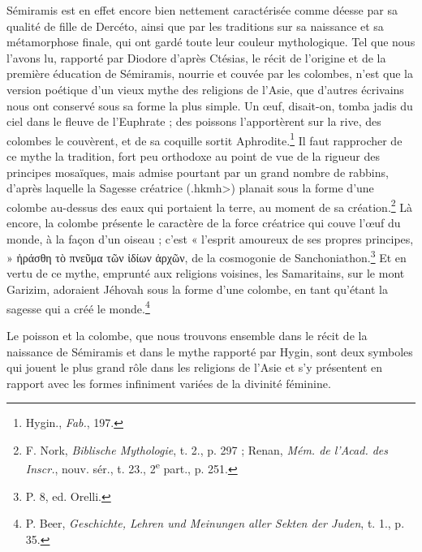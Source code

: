 \documentclass[a4paper, 11pt, oneside, landscape]{article}
\begin{document}
Sémiramis est en effet encore bien nettement caractérisée comme déesse par sa qualité de fille de Dercéto, ainsi que par les traditions sur sa naissance et sa métamorphose finale, qui ont gardé toute leur couleur mythologique. Tel que nous l'avons lu, rapporté par Diodore d'après Ctésias, le récit de l'origine et de la première éducation de Sémiramis, nourrie et couvée par les colombes, n'est que la version poétique d'un vieux mythe des religions de l'Asie, que d'autres écrivains nous ont conservé sous sa forme la plus simple. Un œuf, disait-on, tomba jadis du ciel dans le fleuve de l'Euphrate ; des poissons l'apportèrent sur la rive, des colombes le couvèrent, et de sa coquille sortit Aphrodite.\footnote{Hygin., \emph{Fab.}, 197.} Il faut rapprocher de ce mythe la tradition, fort peu orthodoxe au point de vue de la rigueur des principes mosaïques, mais admise pourtant par un grand nombre de rabbins, d'après laquelle la Sagesse créatrice (\<.hkmh>) planait sous la forme d'une colombe au-dessus des eaux qui portaient la terre, au moment de sa création.\footnote{F. Nork, \emph{Biblische Mythologie}, t. 2., p. 297 ; Renan, \emph{Mém. de l'Acad. des Inscr.}, nouv. sér., t. 23., 2\textsuperscript{e} part., p. 251.} Là encore, la colombe présente le caractère de la force créatrice qui couve l'œuf du monde, à la façon d'un oiseau ; c'est « l'esprit amoureux de ses propres principes, » ἡράσθη τὸ πνεῦμα τῶν ἰδίων ἀρχῶν, de la cosmogonie de Sanchoniathon.\footnote{P. 8, ed. Orelli.} Et en vertu de ce mythe, emprunté aux religions voisines, les Samaritains, sur le mont Garizim, adoraient Jéhovah sous la forme d'une colombe, en tant qu'étant la sagesse qui a créé le monde.\footnote{P. Beer, \emph{Geschichte, Lehren und Meinungen aller Sekten der Juden}, t. 1., p. 35.}

Le poisson et la colombe, que nous trouvons ensemble dans le récit de la naissance de Sémiramis et dans le mythe rapporté par Hygin, sont deux symboles qui jouent le plus grand rôle dans les religions de l'Asie et s'y présentent en rapport avec les formes infiniment variées de la divinité féminine.
\end{document}
